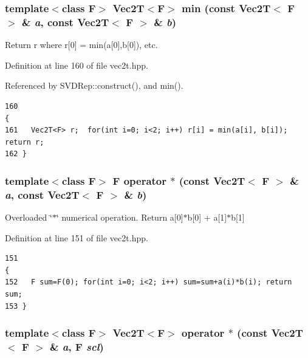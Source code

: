 \subsubsection{\setlength{\rightskip}{0pt plus 5cm}template$<$class F$>$ {\bf Vec2T}$<$F$>$ min (const {\bf Vec2T}$<$ F $>$ \& {\em a}, const {\bf Vec2T}$<$ F $>$ \& {\em b})\hspace{0.3cm}{\tt  [inline]}}\label{vec2t_8hpp_3d32e9b8cfa74d624fa750fec130dec5_3d32e9b8cfa74d624fa750fec130dec5}


Return r where r[0] = min(a[0],b[0]), etc. 

Definition at line 160 of file vec2t.hpp.

Referenced by SVDRep::construct(), and min().

\footnotesize\begin{verbatim}160                                                                              {
161   Vec2T<F> r;  for(int i=0; i<2; i++) r[i] = min(a[i], b[i]); return r;
162 }
\end{verbatim}\normalsize 


\subsubsection{\setlength{\rightskip}{0pt plus 5cm}template$<$class F$>$ F operator $\ast$ (const {\bf Vec2T}$<$ F $>$ \& {\em a}, const {\bf Vec2T}$<$ F $>$ \& {\em b})\hspace{0.3cm}{\tt  [inline]}}\label{vec2t_8hpp_482f49e9bcf500c34929d2dea75f7382_482f49e9bcf500c34929d2dea75f7382}


Overloaded \char`\"{}$\ast$\char`\"{} numerical operation. Return a[0]$\ast$b[0] + a[1]$\ast$b[1] 

Definition at line 151 of file vec2t.hpp.

\footnotesize\begin{verbatim}151                                                                              {
152   F sum=F(0); for(int i=0; i<2; i++) sum=sum+a(i)*b(i); return sum;
153 }
\end{verbatim}\normalsize 


\subsubsection{\setlength{\rightskip}{0pt plus 5cm}template$<$class F$>$ {\bf Vec2T}$<$F$>$ operator $\ast$ (const {\bf Vec2T}$<$ F $>$ \& {\em a}, F {\em scl})\hspace{0.3cm}{\tt  [inline]}}\label{vec2t_8hpp_bd762b1345b4e3277e8c055d1a56c7dd_bd762b1345b4e3277e8c055d1a56c7dd}


